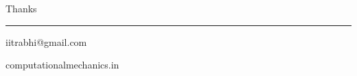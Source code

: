 \begin{frame}
\centering
Thanks

\rule{180pt}{1pt}

iitrabhi@gmail.com

computationalmechanics.in
\end{frame}
